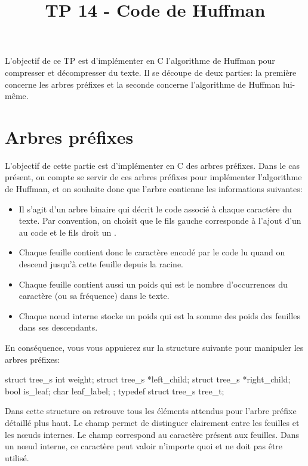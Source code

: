 \documentclass[a4paper, 10pt]{article}
\title{TP 14 - Code de Huffman}
\begin{document}
\maketitle
L'objectif de ce TP est d'implémenter en C l'algorithme de Huffman pour compresser et décompresser du texte. Il se découpe de deux parties: la première concerne les arbres préfixes et la seconde concerne l'algorithme de Huffman lui-même.
\section{Arbres préfixes}
L'objectif de cette partie est d'implémenter en C des arbres préfixes. Dans le cas présent, on compte se servir de ces arbres préfixes pour implémenter l'algorithme de Huffman, et on souhaite donc que l'arbre contienne les informations suivantes:
\begin{itemize}
\item Il s'agit d'un arbre binaire qui décrit le code associé à chaque caractère du texte. Par convention, on choisit que le fils gauche corresponde à l'ajout d'un  au code et le fils droit un .
\item Chaque feuille contient donc le caractère encodé par le code lu quand on descend jusqu'à cette feuille depuis la racine.
\item Chaque feuille contient aussi un poids qui est le nombre d'occurrences du caractère (ou sa fréquence) dans le texte.
\item Chaque nœud interne stocke un poids qui est la somme des poids des feuilles dans ses descendants.
\end{itemize}

En conséquence, vous vous appuierez sur la structure suivante pour manipuler les arbres préfixes:
\begin{ccode}
struct tree_s
  {
    int weight;
    struct tree_s *left_child;
    struct tree_s *right_child;
    bool is_leaf;
    char leaf_label;
  };
typedef struct tree_s tree_t;
\end{ccode}
Dans cette structure on retrouve tous les éléments attendus pour l'arbre préfixe détaillé plus haut. Le champ  permet de distinguer clairement entre les feuilles et les nœuds internes. Le champ  correspond au caractère présent aux feuilles. Dans un nœud interne, ce caractère peut valoir n'importe quoi et ne doit pas être utilisé.
\end{document}
